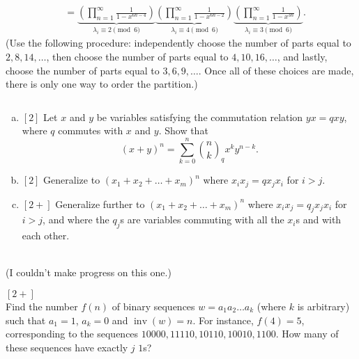 \documentclass{article}
\newenvironment{problem}[2][Problem]{\begin{trivlist}
\item[\hskip \labelsep {\bfseries #1}\hskip \labelsep {\bfseries #2.}]}{\end{trivlist}}
\newenvironment{solution}[1][Solution.]{\begin{trivlist}
\item[\hskip \labelsep {\bfseries #1}]}{\end{trivlist}}
\begin{document}
\begin{solution}
\begin{align*}
    &= \underbrace{\left(\prod_{n=1}^\infty\frac{1}{1-x^{6n - 4}}\right)}_{\lambda_i \equiv 2 \!\!\!\pmod{6}}
    \underbrace{\left(\prod_{n=1}^\infty\frac{1}{1-x^{6n - 2}}\right)}_{\lambda_i \equiv 4 \!\!\!\pmod{6}}
    \underbrace{\left(\prod_{n=1}^\infty\frac{1}{1-x^{3n}}\right)}_{\lambda_i \equiv 3 \!\!\!\pmod{6}}.
  \end{align*}
  (Use the following procedure: independently choose the number of parts equal
  to $2, 8, 14, \hdots$,
  then choose the number of parts equal to $4, 10, 16, \hdots$,
  and lastly, choose the number of parts equal to $3, 6, 9, \hdots$. Once all
  of these choices are made, there is only one way to order the partition.)
\end{solution}
\pagebreak
\begin{problem}{102} $ $
  \begin{enumerate}[(a)]
    \item $[2]$ Let $x$ and $y$ be variables satisfying the commutation relation
    $yx = qxy$, where $q$ commutes with $x$ and $y$. Show that \[
      (x + y)^n = \sum_{k=0}^n \binom{n}{k}_{\!\!q}x^ky^{n-k}.
    \]
    \item $[2]$ Generalize to $(x_1 + x_2 + \hdots + x_m)^n$ where
    $x_ix_j = qx_jx_i$ for $i > j$.

    \item $[2+]$ Generalize further to $(x_1 + x_2 + \hdots + x_m)^n$ where
    $x_ix_j = q_jx_jx_i$ for $i > j$, and where the $q_j$s are variables
    commuting with all the $x_i$s and with each other.
  \end{enumerate}
\end{problem}

\begin{solution} \text{} \\
  (I couldn't make progress on this one.)
\end{solution}
\pagebreak
\begin{problem}{125} $[2+]$ \\
  Find the number $f(n)$ of binary sequences $w = a_1a_2\hdots a_k$ (where $k$
  is arbitrary) such that $a_1 = 1$, $a_k=0$ and $\operatorname{inv}(w) = n$.
  For instance, $f(4) = 5$, corresponding to the sequences
  $10000, 11110, 10110, 10010, 1100$. How many of these sequences have exactly
  $j$ $1$s?
\end{problem}
\end{document}

